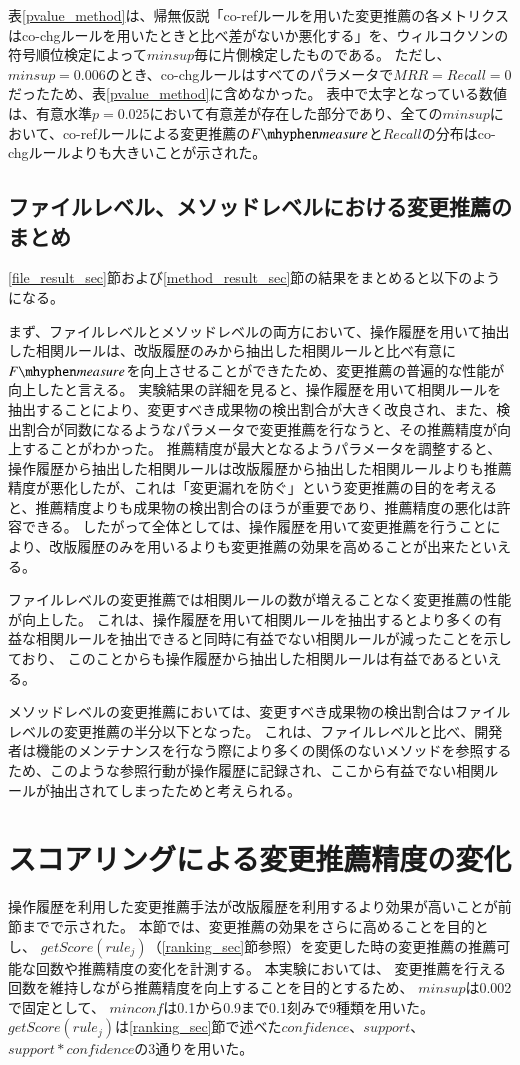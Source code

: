 \documentclass[a4paper]{jsbook}
\newcommand{\minconf}{mincon\!f}
\newcommand{\confidence}{con\!f\!idence}
\newcommand{\fmeasure}{F\mhyphen measure}
\newcommand{\getScore}{getS\!core}
\begin{document}
表\ref{pvalue_method}は、帰無仮説「co-refルールを用いた変更推薦の各メトリクスはco-chgルールを用いたときと比べ差がないか悪化する」を、ウィルコクソンの符号順位検定によって$minsup$毎に片側検定したものである。
ただし、$minsup=0.006$のとき、co-chgルールはすべてのパラメータで$MRR=Recall=0$だったため、表\ref{pvalue_method}に含めなかった。
表中で太字となっている数値は、有意水準$p=0.025$において有意差が存在した部分であり、全ての$minsup$において、co-refルールによる変更推薦の$\fmeasure$と$Recall$の分布はco-chgルールよりも大きいことが示された。

\subsection{ファイルレベル、メソッドレベルにおける変更推薦のまとめ}
\ref{file_result_sec}節および\ref{method_result_sec}節の結果をまとめると以下のようになる。

まず、ファイルレベルとメソッドレベルの両方において、操作履歴を用いて抽出した相関ルールは、改版履歴のみから抽出した相関ルールと比べ有意に$\fmeasure$を向上させることができたため、変更推薦の普遍的な性能が向上したと言える。
実験結果の詳細を見ると、操作履歴を用いて相関ルールを抽出することにより、変更すべき成果物の検出割合が大きく改良され、また、検出割合が同数になるようなパラメータで変更推薦を行なうと、その推薦精度が向上することがわかった。
推薦精度が最大となるようパラメータを調整すると、操作履歴から抽出した相関ルールは改版履歴から抽出した相関ルールよりも推薦精度が悪化したが、これは「変更漏れを防ぐ」という変更推薦の目的を考えると、推薦精度よりも成果物の検出割合のほうが重要であり、推薦精度の悪化は許容できる。
したがって全体としては、操作履歴を用いて変更推薦を行うことにより、改版履歴のみを用いるよりも変更推薦の効果を高めることが出来たといえる。

ファイルレベルの変更推薦では相関ルールの数が増えることなく変更推薦の性能が向上した。
これは、操作履歴を用いて相関ルールを抽出するとより多くの有益な相関ルールを抽出できると同時に有益でない相関ルールが減ったことを示しており、
このことからも操作履歴から抽出した相関ルールは有益であるといえる。

メソッドレベルの変更推薦においては、変更すべき成果物の検出割合はファイルレベルの変更推薦の半分以下となった。
これは、ファイルレベルと比べ、開発者は機能のメンテナンスを行なう際により多くの関係のないメソッドを参照するため、このような参照行動が操作履歴に記録され、ここから有益でない相関ルールが抽出されてしまったためと考えられる。

\section{スコアリングによる変更推薦精度の変化}\label{varyscoring_sec}
操作履歴を利用した変更推薦手法が改版履歴を利用するより効果が高いことが前節までで示された。
本節では、変更推薦の効果をさらに高めることを目的とし、
$\getScore(rule_j)$（\ref{ranking_sec}節参照）を変更した時の変更推薦の推薦可能な回数や推薦精度の変化を計測する。
本実験においては、
変更推薦を行える回数を維持しながら推薦精度を向上することを目的とするため、
$minsup$は0.002で固定として、
$\minconf$は0.1から0.9まで0.1刻みで9種類を用いた。
$\getScore(rule_j)$は\ref{ranking_sec}節で述べた$\confidence$、$support$、$support*\confidence$の3通りを用いた。
\end{document}

